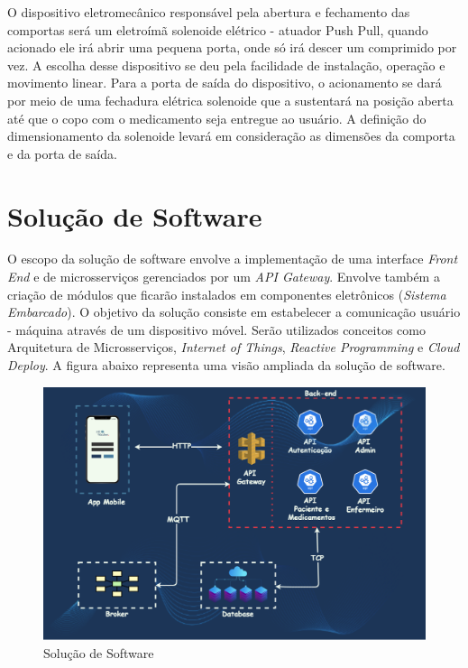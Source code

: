 O dispositivo eletromecânico responsável pela abertura e fechamento das comportas será um eletroímã solenoide elétrico - atuador Push Pull, quando acionado ele irá abrir uma pequena porta, onde só irá descer um comprimido por vez. A escolha desse dispositivo se deu pela facilidade de instalação, operação e movimento linear. Para a porta de saída do dispositivo, o acionamento se dará por meio de uma fechadura elétrica solenoide que a sustentará na posição aberta até que o copo com o medicamento seja entregue ao usuário. A definição do dimensionamento da solenoide levará em consideração as dimensões da comporta e da porta de saída.



\section{Solução de Software}

O escopo da solução de software envolve a implementação de uma interface \emph{Front End} e de microsserviços gerenciados por um \emph{API Gateway}. Envolve também a criação de módulos que ficarão instalados em componentes eletrônicos (\emph{Sistema Embarcado}). O objetivo da solução consiste em estabelecer a comunicação usuário - máquina através de um dispositivo móvel. Serão utilizados conceitos como Arquitetura de Microsserviços, \emph{Internet of Things}, \emph{Reactive Programming} e \emph{Cloud Deploy}. A figura abaixo representa uma visão ampliada da solução de software.

\begin{figure}[H]
    \centering
    \includegraphics[width=1.0\textwidth]{figuras/solucao_software.png}
    \caption{Solução de Software}
    \label{fig:software_solution}
\end{figure}

